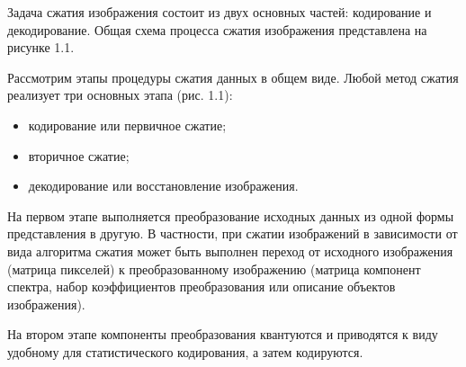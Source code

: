 
Задача сжатия изображения состоит из двух основных частей:
кодирование и декодирование. %
Общая схема процесса
сжатия изображения представлена на рисунке 1.1.

Рассмотрим этапы процедуры сжатия данных в общем виде. Любой метод
сжатия реализует три основных этапа (рис. 1.1):
\begin{itemize}
\item кодирование или первичное сжатие;
\item вторичное сжатие;
\item декодирование или восстановление изображения.
\end{itemize}

На первом этапе выполняется преобразование исходных данных из одной
формы представления в другую. В частности, при сжатии изображений в
зависимости от вида алгоритма сжатия может быть выполнен переход от
исходного изображения (матрица пикселей) к преобразованному изображению (матрица компонент спектра, набор коэффициентов преобразования или описание объектов изображения). \cite{9}
 
На втором этапе компоненты преобразования квантуются и приводятся к
виду удобному для статистического кодирования, а затем кодируются. \cite{10}


